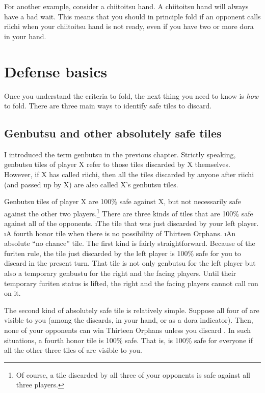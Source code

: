 \bigskip
For another example, consider a {\jap chiitoitsu} hand. A {\jap chiitoitsu} hand will always have a bad wait. This means that you should in principle fold if an opponent calls riichi when your {\jap chiitoitsu} hand is not ready, even if you have two or more {\jap dora} in your hand.

\section{Defense basics} \label{sec:defense}

Once you understand the criteria to fold, the next thing you need to know is \emph{how} to fold. There are three main ways to identify safe tiles to discard. 

\subsection{{\jap Genbutsu} and other absolutely safe tiles}  \label{sec:genbutsu_def}
I introduced the term {\jap genbutsu} in the previous chapter. Strictly speaking, {\jap genbutsu} tiles of player X refer to those tiles discarded by X themselves. However, if X has called riichi, then all the tiles discarded by anyone after riichi (and passed up by X) are also called X's {\jap genbutsu} tiles. 

\bigskip
{\jap Genbutsu} tiles of player X are 100\% safe against X, but not necessarily safe against the other two players.\footnote{Of course, a tile discarded by all three of your opponents is safe against all three players.} There are three kinds of tiles that are 100\% safe against all of the opponents. 
\bi
\i The tile that was just discarded by your left player.
\i A fourth honor tile when there is no possibility of Thirteen Orphans.
\i An absolute ``no chance'' tile.
\ei
The first kind is fairly straightforward. Because of the {\jap furiten} rule, the tile just discarded by the left player is 100\% safe for you to discard in the present turn. That tile is not only {\jap genbutsu} for the left player but also a temporary {\jap genbustu} for the right and the facing players. Until their temporary {\jap furiten} status is lifted, the right and the facing players cannot call {\jap ron} on it. 

\bigskip
The second kind of absolutely safe tile is relatively simple. Suppose all four of {\LARGE{}} are visible to you (among the discards, in your hand, or as a {\jap dora} indicator). Then, none of your opponents can win Thirteen Orphans unless you discard {\LARGE{}}. In such situations, a fourth honor tile is 100\% safe. That is, {\LARGE\dong} is 100\% safe for everyone if all the other three tiles of {\LARGE\dong} are visible to you.

